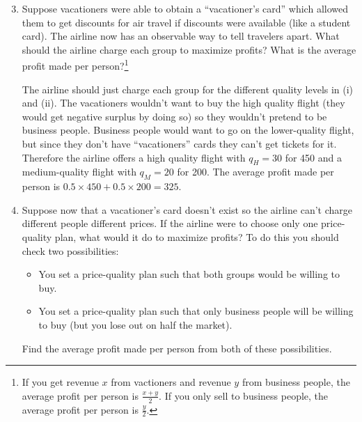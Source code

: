 \documentclass[12pt]{article}
\newcounter{question}[section]
\newenvironment{subquestions}{
  \begin{enumerate}[label=(\roman*)]}{\end{enumerate}}
\begin{document}
\begin{subquestions}
  \setcounter{enumi}{2}
  \item Suppose vacationers were able to obtain a ``vacationer's card'' which allowed them to get discounts for air travel if discounts were available (like a student card). The airline now has an observable way to tell travelers apart. What should the airline charge each group to maximize profits? What is the average profit made per person?\footnote{If you get revenue $x$ from vactioners and revenue $y$ from business people, the average profit per person is $\frac{x+y}{2}$. If you only sell to business people, the average profit per person is $\frac{y}{2}$.}

      \textcolor{solution-color}{
        The airline should just charge each group for the different quality levels in (i) and (ii). The vacationers wouldn't want to buy the high quality flight (they would get negative surplus by doing so) so they wouldn't pretend to be business people. Business people would want to go on the lower-quality flight, but since they don't have ``vacationers'' cards they can't get tickets for it.  Therefore the airline offers a high quality flight with $q_H=30$ for 450 and a medium-quality flight with $q_M=20$ for 200. The average profit made per person is $0.5\times 450 + 0.5\times 200= 325$.
      }
  \item Suppose now that a vacationer's card doesn't exist so the airline can't charge different people different prices.  If the airline were to choose only one price-quality plan, what would it do to maximize profits? To do this you should check two possibilities:
    \begin{itemize}
      \item You set a price-quality plan such that both groups would be
        willing to buy.
      \item You set a price-quality plan such that only business people will
        be willing to buy (but you lose out on half the market).
    \end{itemize}
    Find the average profit made per person from both of these possibilities.


\end{subquestions}
\end{document}
